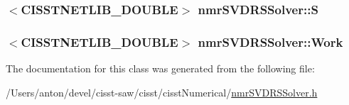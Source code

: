 \subsubsection[{S}]{$<$C\+I\+S\+S\+T\+N\+E\+T\+L\+I\+B\+\_\+\+D\+O\+U\+B\+L\+E$>$ nmr\+S\+V\+D\+R\+S\+Solver\+::\+S\hspace{0.3cm}{\ttfamily [protected]}}\label{classnmr_s_v_d_r_s_solver_a7ec50f8b0ef442501f1c0b866f337474}
\hypertarget{classnmr_s_v_d_r_s_solver_a96c3cc87d1659d99563064e240d5d087}{}
\subsubsection[{Work}]{$<$C\+I\+S\+S\+T\+N\+E\+T\+L\+I\+B\+\_\+\+D\+O\+U\+B\+L\+E$>$ nmr\+S\+V\+D\+R\+S\+Solver\+::\+Work\hspace{0.3cm}{\ttfamily [protected]}}\label{classnmr_s_v_d_r_s_solver_a96c3cc87d1659d99563064e240d5d087}


The documentation for this class was generated from the following file\+:\begin{DoxyCompactItemize}
\item 
/\+Users/anton/devel/cisst-\/saw/cisst/cisst\+Numerical/\hyperlink{nmr_s_v_d_r_s_solver_8h}{nmr\+S\+V\+D\+R\+S\+Solver.\+h}\end{DoxyCompactItemize}
